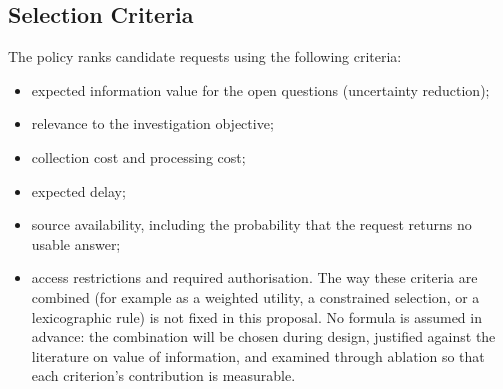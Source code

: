 \documentclass[a4paper,11pt,oneside]{article}
\begin{document}
\subsection{Selection Criteria}
The policy ranks candidate requests using the following criteria:
\begin{itemize}[leftmargin=*, itemsep=2pt, topsep=3pt]
\item expected information value for the open questions (uncertainty reduction);
\item relevance to the investigation objective;
\item collection cost and processing cost;
\item expected delay;
\item source availability, including the probability that the request returns no usable
answer;
\item access restrictions and required authorisation.
The way these criteria are combined (for example as a weighted utility, a constrained selection, or a lexicographic rule) is not fixed in this proposal. No formula is assumed in advance: the combination will be chosen during design, justified against the literature on value of information, and examined through ablation so that each criterion’s contribution is measurable.
\end{itemize}
\end{document}
